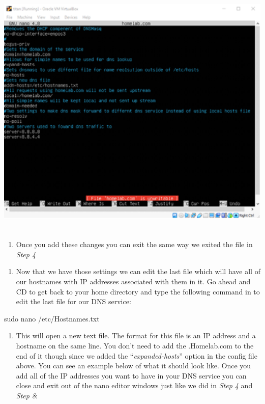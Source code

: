 \documentclass{article} %
\begin{document}
\noindent 

\noindent 

\noindent 

\noindent 

\noindent \includegraphics*[width=5.82in, height=4.85in, keepaspectratio=false]{image2}

\noindent 

\begin{enumerate}
\item  Once you add these changes you can exit the same way we exited the file in \textit{Step 4}
\end{enumerate}

\noindent 

\noindent 

\begin{enumerate}
\item  Now that we have those settings we can edit the last file which will have all of our hostnames with IP addresses associated with them in it. Go ahead and CD to get back to your home directory and type the following command in to edit the last file for our DNS service:
\end{enumerate}

\noindent 

\noindent sudo nano /etc/Hostnames.txt

\noindent 

\begin{enumerate}
\item  This will open a new text file. The format for this file is an IP address and a hostname on the same line. You don't need to add the .Homelab.com to the end of it though since we added the ``\textit{expanded-hosts}'' option in the config file above. You can see an example below of what it should look like. Once you add all of the IP addresses you want to have in your DNS service you can close and exit out of the nano editor windows just like we did in \textit{Step 4} and \textit{Step 8}:
\end{enumerate}
\end{document}
